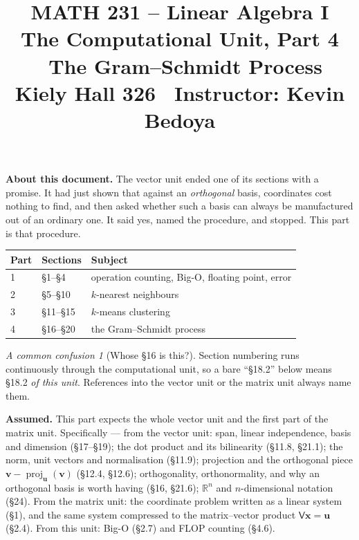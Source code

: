 \documentclass[11pt]{article}
\title{\vspace{-1.2cm}\textbf{\sffamily MATH 231 -- Linear Algebra I}\\[4pt]
       {\large\sffamily The Computational Unit, Part 4 \textbullet\
        The Gram--Schmidt Process}\\[2pt]
       {\normalsize\sffamily Kiely Hall 326 \textbullet\
        Instructor: Kevin Bedoya}}
\author{}
\date{}
\theoremstyle{plain}
\theoremstyle{definition}
\theoremstyle{remark}
\newtheorem*{warn}{A common confusion}
\newcommand{\R}{\mathbb{R}}
\newcommand{\vc}[1]{\mathbf{#1}}
\newcommand{\proj}[2]{\operatorname{proj}_{#1}(#2)}
\begin{document}
\setcounter{section}{15}  %
\maketitle
\vspace{-1.6cm}

\noindent\textbf{About this document.} The vector unit ended one of its sections
with a promise. It had just shown that against an \emph{orthogonal} basis,
coordinates cost nothing to find, and then asked whether such a basis can always
be manufactured out of an ordinary one. It said yes, named the procedure, and
stopped. This part is that procedure.

\begin{center}
\renewcommand{\arraystretch}{1.2}
\begin{tabular}{@{}l l l@{}}
\toprule
\textbf{Part} & \textbf{Sections} & \textbf{Subject} \\
\midrule
1 & \S1--\S4    & operation counting, Big-O, floating point, error \\
2 & \S5--\S10   & $k$-nearest neighbours \\
3 & \S11--\S15  & $k$-means clustering \\
4 & \S16--\S20  & the Gram--Schmidt process \\
\bottomrule
\end{tabular}
\end{center}

\begin{warn}[Whose \S16 is this?]
Section numbering runs continuously through the computational unit, so a bare
``\S18.2'' below means \S18.2 \emph{of this unit}. References into the vector
unit or the matrix unit always name them.
\end{warn}

\medskip
\noindent\textbf{Assumed.} This part expects the whole vector unit and the first
part of the matrix unit. Specifically --- from the vector unit: span, linear
independence, basis and dimension (\S17--\S19); the dot product and its
bilinearity (\S11.8, \S21.1); the norm, unit vectors and normalisation
(\S11.9); projection and the orthogonal piece $\vc{v}-\proj{\vc{u}}{\vc{v}}$
(\S12.4, \S12.6); orthogonality, orthonormality, and why an orthogonal basis is
worth having (\S16, \S21.6); $\R^{n}$ and $n$-dimensional notation (\S24). From
the matrix unit: the coordinate problem written as a linear system (\S1), and
the same system compressed to the matrix--vector product $\mathsf{V}\vc{x}=\vc{u}$
(\S2.4). From this unit: Big-O (\S2.7) and FLOP counting (\S4.6).
\end{document}
